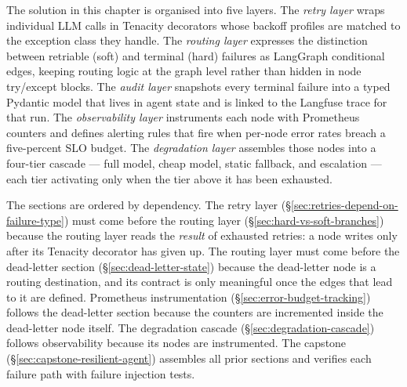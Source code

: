 The solution in this chapter is organised into five layers. The
\emph{retry layer} wraps individual LLM calls in Tenacity decorators whose
backoff profiles are matched to the exception class they handle. The
\emph{routing layer} expresses the distinction between retriable (soft)
and terminal (hard) failures as LangGraph conditional edges, keeping routing
logic at the graph level rather than hidden in node try/except blocks. The
\emph{audit layer} snapshots every terminal failure into a typed
 Pydantic model that lives in agent state and is
linked to the Langfuse trace for that run. The \emph{observability layer}
instruments each node with Prometheus counters and defines alerting rules
that fire when per-node error rates breach a five-percent SLO budget. The
\emph{degradation layer} assembles those nodes into a four-tier cascade ---
full model, cheap model, static fallback, and escalation --- each tier
activating only when the tier above it has been exhausted.

The sections are ordered by dependency. The retry layer
(\S\ref{sec:retries-depend-on-failure-type}) must come before the routing
layer (\S\ref{sec:hard-vs-soft-branches}) because the routing layer reads
the \emph{result} of exhausted retries: a node writes 
only after its Tenacity decorator has given up. The routing layer must come
before the dead-letter section (\S\ref{sec:dead-letter-state}) because the
dead-letter node is a routing destination, and its contract is only
meaningful once the edges that lead to it are defined. Prometheus
instrumentation (\S\ref{sec:error-budget-tracking}) follows the dead-letter
section because the counters are incremented inside the dead-letter node
itself. The degradation cascade (\S\ref{sec:degradation-cascade}) follows
observability because its nodes are instrumented. The capstone
(\S\ref{sec:capstone-resilient-agent}) assembles all prior sections and
verifies each failure path with failure injection tests.

